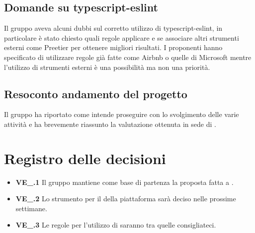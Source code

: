 \subsection{Domande su typescript-eslint}
Il gruppo aveva alcuni dubbi sul corretto utilizzo di typescript-eslint, in particolare è stato chiesto quali regole applicare e se associare altri strumenti esterni come Preetier per ottenere migliori risultati. I proponenti hanno specificato di utilizzare regole già fatte come Airbnb o quelle di Microsoft mentre l'utilizzo di strumenti esterni è una possibilità ma non una priorità.
\subsection{Resoconto andamento del progetto}
Il gruppo ha riportato come intende proseguire con lo svolgimento delle varie attività e ha brevemente riassunto la valutazione ottenuta in sede di . 

\section{Registro delle decisioni}
\begin{itemize}
	\item \textbf{VE\_\Data.1} Il gruppo mantiene come base di partenza la proposta fatta a \Proponente.
   \item \textbf{VE\_\Data.2} Lo strumento per il  della piattaforma sarà deciso nelle prossime settimane.
   \item \textbf{VE\_\Data.3} Le regole per l'utilizzo di  saranno tra quelle consigliateci.
\end{itemize}